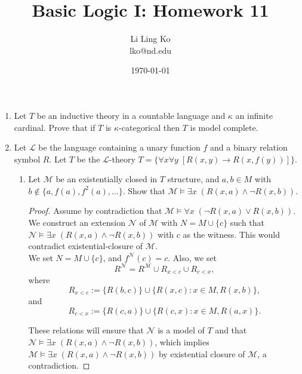 \documentclass{article}
\begin{document}
\title{Basic Logic I: Homework 11}
\author{Li Ling Ko\\ lko@nd.edu}
\date{\today}
\maketitle

\begin{enumerate}[label={\bf Q\arabic*:}]
  \item Let $T$ be an inductive theory in a countable language and $\kappa$
    an infinite cardinal. Prove that if $T$ is $\kappa$-categorical then
    $T$ is model complete.

  \item Let $\mathcal{L}$ be the language containing a unary function $f$
    and a binary relation symbol $R$. Let $T$ be the $\mathcal{L}$-theory
    $T=\{\forall x\forall y\; [R(x,y)\rightarrow R(x,f(y))]\}$.

    \begin{enumerate}
      \item Let $\mathcal{M}$ be an existentially closed in $T$ structure,
        and $a,b\in M$ with $b\not\in\{a,f(a),f^2(a),\ldots\}$. Show that
        $\mathcal{M}\models \exists x\; (R(x,a)\wedge\neg R(x,b))$.

        \begin{proof}
          Assume by contradiction that $\mathcal{M}\models \forall x\;
          (\neg R(x,a)\vee R(x,b))$. We construct an extension
          $\mathcal{N}$ of $\mathcal{M}$ with $N=M\cup\{c\}$ such that
          $\mathcal{N}\models \exists x\; (R(x,a)\wedge\neg R(x,b))$ with
          $c$ as the witness. This would contradict existential-closure of
          $\mathcal{M}$. \\

          We set $N=M\cup\{c\}$, and $f^\mathcal{N}(c)=c$. Also, we set
          \[R^\mathcal{N}= R^\mathcal{M} \cup R_{x<c} \cup R_{c<x},\]
          where
          \[R_{x<c}:= \{R(b,c)\}\cup \{R(x,c):x\in M, R(x,b)\},\]
          and
          \[R_{c<x}:= \{R(c,a)\}\cup \{R(c,x):x\in M, R(a,x)\}.\]

          These relations will ensure that $\mathcal{N}$ is a model of $T$
          and that $\mathcal{N}\models \exists x\; (R(x,a)\wedge\neg
          R(x,b))$, which implies $\mathcal{M}\models \exists x\;
          (R(x,a)\wedge\neg R(x,b))$ by existential closure of
          $\mathcal{M}$, a contradiction.
        \end{proof}
    \end{enumerate}
\end{enumerate}
\end{document}
